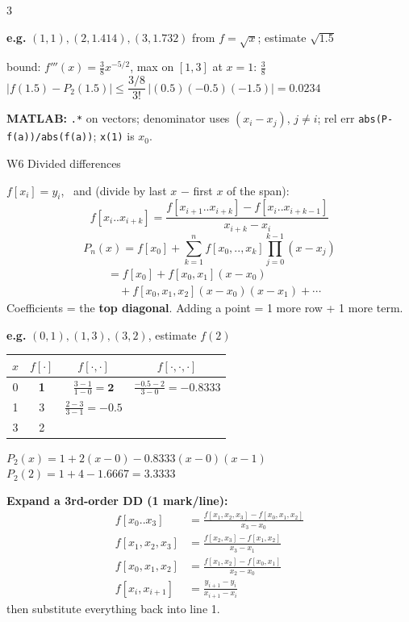 \documentclass[8pt,a4paper]{extarticle}
\newcommand{\hd}[1]{\par\vspace{3pt}\noindent\colorbox{accent}{\parbox{\dimexpr\linewidth-2\fboxsep}{\color{white}\bfseries\strut #1}}\par\vspace{1pt}}
\newcommand{\sub}[1]{\textbf{\color{accent}#1}}
\newenvironment{ex}[1]{\par\vspace{2pt}\noindent\begin{lrbox}{\exbox}\begin{minipage}{\dimexpr\linewidth-2\fboxsep}\RaggedRight\color{grn}\textbf{e.g.} #1\par\setlength{\parskip}{1.5pt}}{\end{minipage}\end{lrbox}\colorbox{exbg}{\usebox{\exbox}}\par\vspace{1pt}}
\begin{document}
\begin{multicols*}{3}
\begin{ex}{$(1,1),(2,1.414),(3,1.732)$ from $f=\sqrt x$; estimate $\sqrt{1.5}$}
bound: $f'''(x)=\frac38x^{-5/2}$, max on $[1,3]$ at $x=1$: $\frac38$\\
$|f(1.5)-P_2(1.5)|\le\dfrac{3/8}{3!}\,|(0.5)(-0.5)(-1.5)|=0.0234$
\end{ex}
\sub{MATLAB:} \texttt{.*} on vectors; denominator uses $(x_i-x_j)$, $j\ne i$; rel err \texttt{abs(P-f(a))/abs(f(a))}; \texttt{x(1)} is $x_0$.

\hd{W6 Divided differences}
$f[x_i]=y_i$, \ and (divide by last $x$ $-$ first $x$ of the span):
\[f[x_i..x_{i+k}]=\frac{f[x_{i+1}..x_{i+k}]-f[x_i..x_{i+k-1}]}{x_{i+k}-x_i}\]
\[P_n(x)=f[x_0]+\sum_{k=1}^{n}f[x_0,..,x_k]\prod_{j=0}^{k-1}(x-x_j)\]
\begin{align*}&=f[x_0]+f[x_0,x_1](x-x_0)\\&\quad+f[x_0,x_1,x_2](x-x_0)(x-x_1)+\cdots\end{align*}
Coefficients = the \textbf{top diagonal}. Adding a point = 1 more row + 1 more term.
\begin{ex}{$(0,1),(1,3),(3,2)$, estimate $f(2)$}
{\centering\begin{tabular}{@{}c|c|c|c@{}}
$x$ & $f[\cdot]$ & $f[\cdot,\cdot]$ & $f[\cdot,\cdot,\cdot]$\\\hline
0 & \textbf{1} & $\frac{3-1}{1-0}=\mathbf{2}$ & $\frac{-0.5-2}{3-0}=\mathbf{-0.8333}$\\
1 & 3 & $\frac{2-3}{3-1}=-0.5$ & \\
3 & 2 & &
\end{tabular}\par}
$P_2(x)=1+2(x-0)-0.8333(x-0)(x-1)$\\
$P_2(2)=1+4-1.6667=3.3333$
\end{ex}
\sub{Expand a 3rd-order DD (1 mark/line):}
\begin{align*}f[x_0..x_3]&=\tfrac{f[x_1,x_2,x_3]-f[x_0,x_1,x_2]}{x_3-x_0}\\
f[x_1,x_2,x_3]&=\tfrac{f[x_2,x_3]-f[x_1,x_2]}{x_3-x_1}\\
f[x_0,x_1,x_2]&=\tfrac{f[x_1,x_2]-f[x_0,x_1]}{x_2-x_0}\\
f[x_i,x_{i+1}]&=\tfrac{y_{i+1}-y_i}{x_{i+1}-x_i}\end{align*}
then substitute everything back into line 1.


\end{multicols*}
\end{document}
